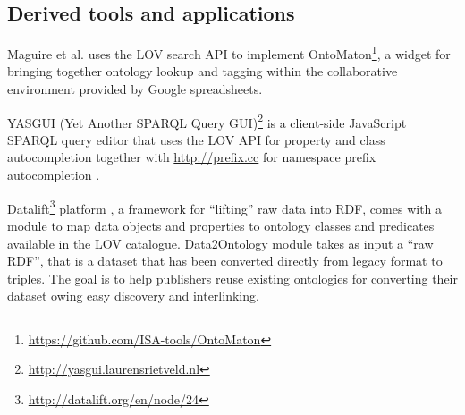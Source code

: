 \documentclass{iosart2c}
\begin{document}
\subsection{Derived tools and applications}

Maguire et al. \cite{ontomaton12} uses the LOV search API to implement OntoMaton\footnote{\url{https://github.com/ISA-tools/OntoMaton}}, a widget for bringing together ontology lookup and tagging within the collaborative environment provided by Google spreadsheets. 

YASGUI (Yet Another SPARQL Query GUI)\footnote{\url{http://yasgui.laurensrietveld.nl}} is a client-side JavaScript SPARQL query editor that uses the LOV API for property and class autocompletion together with \url{http://prefix.cc} for namespace prefix autocompletion \cite{yasgui}.

Datalift\footnote{\url{http://datalift.org/en/node/24}} platform \cite{scharffe_2012}, a framework for ``lifting'' raw data into RDF, comes with a module to map data objects and properties to ontology classes and predicates available in the LOV catalogue. Data2Ontology module takes as input a ``raw RDF'', that is a dataset that has been converted directly from legacy format to triples. The goal is to help publishers reuse existing ontologies for converting their dataset owing easy discovery and interlinking. 
\end{document}
